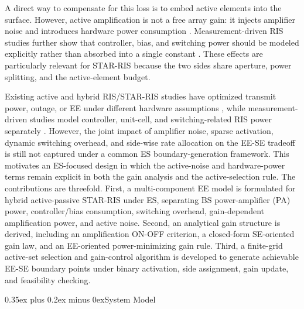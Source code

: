 \documentclass[journal]{IEEEtran}
\makeatletter
\def\section{\@startsection{section}{1}{\z@}{1.2ex plus 0.4ex minus 0.2ex}%
{0.35ex plus 0.2ex minus 0ex}{\normalfont\normalsize\centering\scshape}}%
\makeatother
\begin{document}
A direct way to compensate for this loss is to embed active elements into the surface. However, active amplification is not a free array gain: it injects amplifier noise and introduces hardware power consumption \cite{xu2023activestar,ma2023activeee,peng2023hybrid,huang2024hybrid,zhang2022signal}. Measurement-driven RIS studies further show that controller, bias, and switching power should be modeled explicitly rather than absorbed into a single constant \cite{wang2023static,wang2024practical}. These effects are particularly relevant for STAR-RIS because the two sides share aperture, power splitting, and the active-element budget.

Existing active and hybrid RIS/STAR-RIS studies have optimized transmit power, outage, or EE under different hardware assumptions \cite{mu2022star,xu2023activestar,ma2023activeee,peng2023hybrid,huang2024hybrid,zhang2022signal,zhang2023activevspassive}, while measurement-driven studies model controller, unit-cell, and switching-related RIS power separately \cite{wang2023static,wang2024practical}. However, the joint impact of amplifier noise, sparse activation, dynamic switching overhead, and side-wise rate allocation on the EE-SE tradeoff is still not captured under a common ES boundary-generation framework. This motivates an ES-focused design in which the active-noise and hardware-power terms remain explicit in both the gain analysis and the active-selection rule. The contributions are threefold. First, a multi-component EE model is formulated for hybrid active-passive STAR-RIS under ES, separating BS power-amplifier (PA) power, controller/bias consumption, switching overhead, gain-dependent amplification power, and active noise. Second, an analytical gain structure is derived, including an amplification ON-OFF criterion, a closed-form SE-oriented gain law, and an EE-oriented power-minimizing gain rule. Third, a finite-grid active-set selection and gain-control algorithm is developed to generate achievable EE-SE boundary points under binary activation, side assignment, gain update, and feasibility checking.

\section{System Model}
\end{document}
